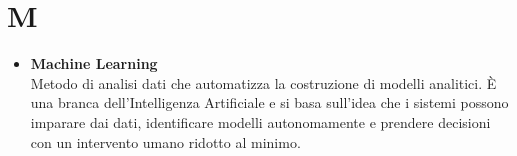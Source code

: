 \chapter{M} \label{M}
\begin{itemize}
	\item \textbf{Machine Learning} \\
	Metodo di analisi dati che automatizza la costruzione di modelli analitici. È una branca dell'Intelligenza Artificiale e si basa sull'idea che i sistemi possono imparare dai dati, identificare modelli autonomamente e prendere decisioni con un intervento umano ridotto al minimo.
\end{itemize}